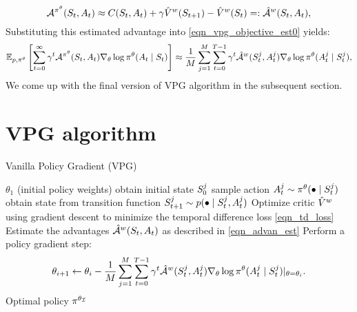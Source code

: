 \documentclass[12pt,twoside]{../../mitthesis}
\begin{document}
\begin{equation}
    \label{eqn_advan_est}
    \Advan^{\policy^{\theta}}(\State_t, \Action_t) \approx \Cost(\State_t, \Action_t) + \gamma \hat\Value^w(\State_{t+1}) - \hat\Value^w(\State_t) =: \hat\Advan^{w}(\State_t, \Action_t) ,
\end{equation}
Substituting this estimated advantage into \eqref{eqn_vpg_objective_est0} yields:
\begin{equation}
    \label{eqn_vpg_objective_est}
    \E[\transit, \policy^{\theta}]{ \sum_{t = 0}^{\infty}\gamma^t\Advan^{\policy^{\theta}} (\State_t, \Action_t)\nabla_{\theta} \log \policy^{\theta}(\Action_t \mid \State_t)} \approx \frac{1}{M} \sum_{j = 1}^M \sum_{t=0}^{T-1} \gamma ^ t \hat\Advan^{w}(\State_t^j, \Action_t^j) \nabla_{\theta} \log \policy^{\theta}(\Action_t^j \mid \State_t^j),
\end{equation}
We come up with the final version of VPG algorithm in the subsequent section.
\section*{VPG algorithm}
\begin{algorithm}
    \caption{Vanilla Policy Gradient (VPG)}
    \label{alg:my-alg}
    \begin{algorithmic}
     $\theta_1$ (initial policy weights)
            \STATE obtain initial state $S_0^{j}$
                \STATE sample action $A_t^j \sim \pi^{\theta}(\bullet \mid S_t^{j})$
                \STATE obtain state from transition function $S_{t+1}^j \sim p(\bullet \mid S_t^j, A_t^j)$
            \ENDFOR
        \ENDFOR
        \STATE Optimize critic $\hat{V}^{w}$ using gradient descent to minimize the temporal difference loss \eqref{eqn_td_loss}
        \STATE Estimate the advantages $\hat{\mathcal A}^{w}(S_t, A_t)$ as described in \eqref{eqn_advan_est}  
        \STATE Perform a policy gradient step:
        $$
            \theta_{i+1} \leftarrow \theta_i - \frac{1}{M} \sum_{j = 1}^M \sum_{t=0}^{T-1} \gamma ^ t \hat{\mathcal A}^{w}(S_t^j, A_t^j) \nabla_{\theta} \log \pi^{\theta}(A_t^j \mid S_t^j)\rvert_{\theta = \theta_i}.
        $$
    \ENDFOR
    \STATE \RETURN Optimal policy $\pi^{\theta_{\mathcal I}}$
    \end{algorithmic}
\end{algorithm}
\end{document}

